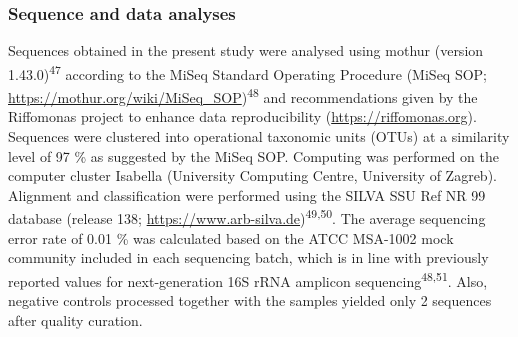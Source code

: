 \documentclass[
  12pt,
]{article}
\begin{document}
\hypertarget{sequence-and-data-analyses}{%
\subsubsection{Sequence and data
analyses}\label{sequence-and-data-analyses}}

Sequences obtained in the present study were analysed using mothur
(version 1.43.0)\textsuperscript{47} according to the MiSeq Standard
Operating Procedure (MiSeq SOP;
\url{https://mothur.org/wiki/MiSeq_SOP})\textsuperscript{48} and
recommendations given by the Riffomonas project to enhance data
reproducibility (\url{https://riffomonas.org}). Sequences were clustered
into operational taxonomic units (OTUs) at a similarity level of 97
\si{\percent} as suggested by the MiSeq SOP. Computing was performed on
the computer cluster Isabella (University Computing Centre, University
of Zagreb). Alignment and classification were performed using the SILVA
SSU Ref NR 99 database (release 138;
\url{https://www.arb-silva.de})\textsuperscript{49,50}. The average
sequencing error rate of 0.01 \si{\percent} was calculated based on the
ATCC MSA-1002 mock community included in each sequencing batch, which is
in line with previously reported values for next-generation 16S rRNA
amplicon sequencing\textsuperscript{48,51}. Also, negative controls
processed together with the samples yielded only 2 sequences after
quality curation.
\end{document}
